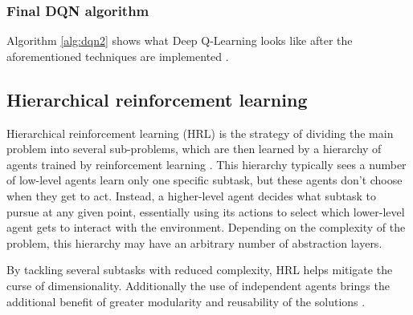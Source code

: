 \subsubsection*{Final DQN algorithm}

Algorithm \ref{alg:dqn2} shows what Deep Q-Learning looks like after the aforementioned techniques are implemented \cite{Mnih:2015}.

\subsection{Hierarchical reinforcement learning}

Hierarchical reinforcement learning (HRL) is the strategy of dividing the main problem into several sub-problems, which are then learned by a hierarchy of agents trained by reinforcement learning \cite{Barto:2003, Al-Emran:2015, Pateria:2021}. This hierarchy typically sees a number of low-level agents learn only one specific subtask, but these agents don't choose when they get to act. Instead, a higher-level agent decides what subtask to pursue at any given point, essentially using its actions to select which lower-level agent gets to interact with the environment. Depending on the complexity of the problem, this hierarchy may have an arbitrary number of abstraction layers.

By tackling several subtasks with reduced complexity, HRL helps mitigate the curse of dimensionality. Additionally the use of independent agents brings the additional benefit of greater modularity and reusability of the solutions \cite{Al-Emran:2015}.